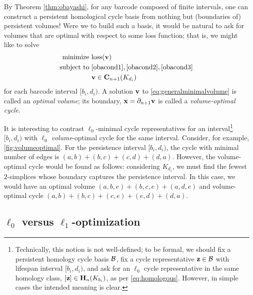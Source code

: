 By Theorem \ref{thm:obayashi}, for any barcode composed of finite intervals, one can construct a persistent homological cycle basis from nothing but (boundaries of) persistent volumes!  Were we to build such a basis, it would be natural to ask for volumes that are optimal with respect to some loss function; that is, we might like to solve
\begin{align}
\begin{split}
    \text{minimize } & \mathrm{loss}(\mathbf{v}) \\
    \text{subject to } 
    & \eqref{obacond1}, \eqref{obacond2}, \eqref{obacond3}\\
    & \textbf{v} \in \mathbf{C}_{n+1}(K_{d_i}) 
\end{split}
\label{eq:generalminimalvolume}
\end{align}
for each barcode interval $[b_i, d_i)$.  A solution $\mathbf{v}$ to \pr \eqref{eq:generalminimalvolume} is called an \emph{optimal volume}; its boundary, $\mathbf{x}=\partial_{n+1}\mathbf{v}$ is called a \emph{volume-optimal cycle}.

It is interesting to contrast $\ell_0$-minimal cycle representatives for an interval\footnote{Technically, this notion is not well-defined; to be formal, we should fix a persistent homology cycle basis $\mathcal B$, fix a cycle representative ${\mathbf z} \in \mathcal B$ with lifespan interval $[b_i, d_i)$, and ask for an $\ell_0$ cycle representative in the same homology class, $[{\mathbf z}] \in \mathbf{H}_n(K_{b_i})$, as per \pr \eqref{eq:homologous}.  However, in simple cases the intended meaning is clear.} $[b_i, d_i)$ with  $\ell_0$ \emph{volume}-optimal cycle for the same interval.  Consider, for example, \fig \ref{fig:volumeoptimal}.  For the persistence interval $[b_i,d_i)$, the cycle with minimal number of edges is $(a,b) + (b,c) + (c,d)  + (d,a)$. However, the volume-optimal cycle would be found as follows: considering $K_{d_i}$, we must find the fewest $2$-simplices whose boundary captures the persistence interval. In this case, we would have an optimal volume  $(a,b,e) + (b,c,e) + (a,d,e)$ and volume-optimal cycle $(a,b)+ (b,c) + (c,e) + (e,d)+ (d,a)$.

\subsection{$\ell_0$ versus $\ell_1$-optimization} \label{secl0l1}

